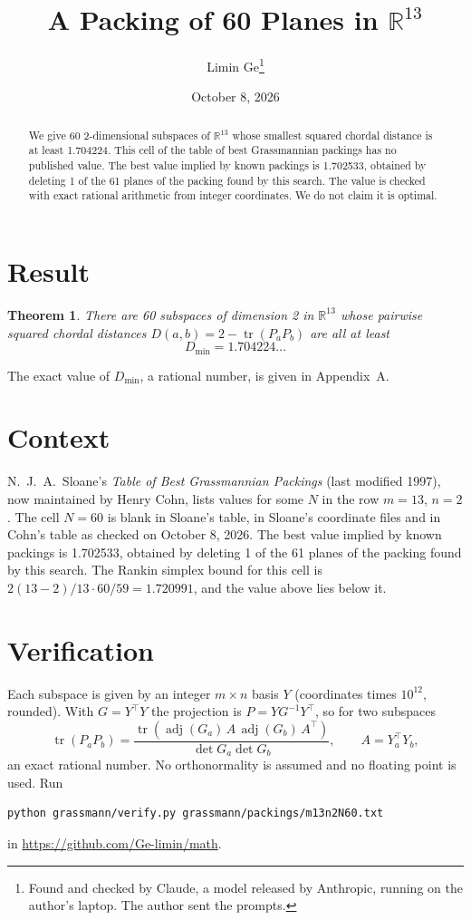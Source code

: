 \documentclass[11pt,a4paper]{article}
\title{A Packing of 60 Planes in $\mathbb{R}^{13}$}
\author{Limin Ge\thanks{Found and checked by Claude, a model released by Anthropic, running on the author's laptop. The author sent the prompts.}}
\date{October 8, 2026}
\newtheorem*{theorem}{Theorem}
\begin{document}
\maketitle
\begin{abstract}
We give 60 2-dimensional subspaces of $\mathbb{R}^{13}$ whose smallest squared chordal distance is at least 1.704224. This cell of the table of best Grassmannian packings has no published value. The best value implied by known packings is 1.702533, obtained by deleting 1 of the 61 planes of the packing found by this search. The value is checked with exact rational arithmetic from integer coordinates. We do not claim it is optimal.
\end{abstract}

\section{Result}
\begin{theorem}
There are 60 subspaces of dimension 2 in $\mathbb{R}^{13}$ whose pairwise squared chordal distances $D(a,b) = 2 - \operatorname{tr}(P_aP_b)$ are all at least
\[ D_{\min} = 1.704224\ldots \]
\end{theorem}
The exact value of $D_{\min}$, a rational number, is given in Appendix~A.


\section{Context}
N.~J.~A.~Sloane's \emph{Table of Best Grassmannian Packings} (last modified 1997), now maintained by Henry Cohn, lists values for some $N$ in the row $m=13$, $n=2$. The cell $N=60$ is blank in Sloane's table, in Sloane's coordinate files and in Cohn's table as checked on October 8, 2026. The best value implied by known packings is 1.702533, obtained by deleting 1 of the 61 planes of the packing found by this search. The Rankin simplex bound for this cell is $2(13-2)/13\cdot 60/59 = 1.720991$, and the value above lies below it.


\section{Verification}
Each subspace is given by an integer $m\times n$ basis $Y$ (coordinates times $10^{12}$, rounded). With $G=Y^\top Y$ the projection is $P=YG^{-1}Y^\top$, so for two subspaces
\[ \operatorname{tr}(P_aP_b)=\frac{\operatorname{tr}(\operatorname{adj}(G_a)\,A\,\operatorname{adj}(G_b)\,A^\top)}{\det G_a\det G_b},\qquad A=Y_a^\top Y_b, \]
an exact rational number. No orthonormality is assumed and no floating point is used. Run
\begin{verbatim}
python grassmann/verify.py grassmann/packings/m13n2N60.txt
\end{verbatim}
in \url{https://github.com/Ge-limin/math}.
\end{document}
